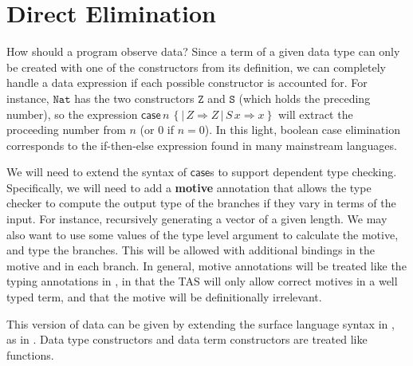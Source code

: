 \section{Direct Elimination}

How should a program observe data?
Since a term of a given data type can only be created with one of the constructors from its definition, we can completely handle a data expression if each possible constructor is accounted for.
For instance, $\mathtt{Nat}$ has the two constructors $\mathtt{Z}$ and $\mathtt{S}$ (which holds the preceding number), so the expression $\mathsf{case}\,n\,\left\{ |\,Z\Rightarrow Z\,|\,S\,x\Rightarrow x\right\}$ will extract the proceeding number from $n$ (or $0$ if $n=0$).
In this light, boolean case elimination corresponds to the if-then-else expression found in many mainstream languages. 

We will need to extend the syntax of $\mathsf{case}$s to support dependent type checking.
Specifically, we will need to add a \textbf{motive} annotation that allows the type checker to compute the output type of the branches if they vary in terms of the input.
For instance, recursively generating a vector of a given length.
We may also want to use some values of the type level argument to calculate the motive, and type the branches.
This will be allowed with additional bindings in the motive and in each branch.
In general, motive annotations will be treated like the typing annotations in , in that the \ac{TAS} will only allow correct motives in a well typed term, and that the motive will be definitionally irrelevant.

This version of data can be given by extending the surface language syntax in , as in .
Data type constructors and data term constructors are treated like functions.

